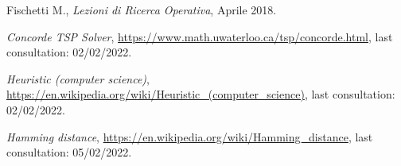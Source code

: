 \begin{thebibliography}{99}


 Fischetti M., \textit{Lezioni di Ricerca Operativa}, Aprile 2018.

 \textit{Concorde TSP Solver}, \url{https://www.math.uwaterloo.ca/tsp/concorde.html}, last consultation: 02/02/2022.

 \textit{Heuristic (computer science)}, \url{https://en.wikipedia.org/wiki/Heuristic_(computer_science)}, last consultation: 02/02/2022.

 \textit{Hamming distance}, \url{https://en.wikipedia.org/wiki/Hamming_distance}, last consultation: 05/02/2022.


\end{thebibliography}

